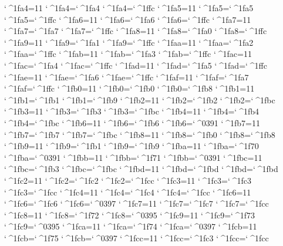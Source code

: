 \catcode`^^^^1fa4=11 \lccode`^^^^1fa4=`^^^^1fa4 \uccode`^^^^1fa4=`^^^^1ffc 
\catcode`^^^^1fa5=11 \lccode`^^^^1fa5=`^^^^1fa5 \uccode`^^^^1fa5=`^^^^1ffc 
\catcode`^^^^1fa6=11 \lccode`^^^^1fa6=`^^^^1fa6 \uccode`^^^^1fa6=`^^^^1ffc 
\catcode`^^^^1fa7=11 \lccode`^^^^1fa7=`^^^^1fa7 \uccode`^^^^1fa7=`^^^^1ffc 
\catcode`^^^^1fa8=11 \lccode`^^^^1fa8=`^^^^1fa0 \uccode`^^^^1fa8=`^^^^1ffc 
\catcode`^^^^1fa9=11 \lccode`^^^^1fa9=`^^^^1fa1 \uccode`^^^^1fa9=`^^^^1ffc 
\catcode`^^^^1faa=11 \lccode`^^^^1faa=`^^^^1fa2 \uccode`^^^^1faa=`^^^^1ffc 
\catcode`^^^^1fab=11 \lccode`^^^^1fab=`^^^^1fa3 \uccode`^^^^1fab=`^^^^1ffc 
\catcode`^^^^1fac=11 \lccode`^^^^1fac=`^^^^1fa4 \uccode`^^^^1fac=`^^^^1ffc 
\catcode`^^^^1fad=11 \lccode`^^^^1fad=`^^^^1fa5 \uccode`^^^^1fad=`^^^^1ffc 
\catcode`^^^^1fae=11 \lccode`^^^^1fae=`^^^^1fa6 \uccode`^^^^1fae=`^^^^1ffc 
\catcode`^^^^1faf=11 \lccode`^^^^1faf=`^^^^1fa7 \uccode`^^^^1faf=`^^^^1ffc 
\catcode`^^^^1fb0=11 \lccode`^^^^1fb0=`^^^^1fb0 \uccode`^^^^1fb0=`^^^^1fb8 
\catcode`^^^^1fb1=11 \lccode`^^^^1fb1=`^^^^1fb1 \uccode`^^^^1fb1=`^^^^1fb9 
\catcode`^^^^1fb2=11 \lccode`^^^^1fb2=`^^^^1fb2 \uccode`^^^^1fb2=`^^^^1fbc 
\catcode`^^^^1fb3=11 \lccode`^^^^1fb3=`^^^^1fb3 \uccode`^^^^1fb3=`^^^^1fbc 
\catcode`^^^^1fb4=11 \lccode`^^^^1fb4=`^^^^1fb4 \uccode`^^^^1fb4=`^^^^1fbc 
\catcode`^^^^1fb6=11 \lccode`^^^^1fb6=`^^^^1fb6 \uccode`^^^^1fb6=`^^^^0391 
\catcode`^^^^1fb7=11 \lccode`^^^^1fb7=`^^^^1fb7 \uccode`^^^^1fb7=`^^^^1fbc 
\catcode`^^^^1fb8=11 \lccode`^^^^1fb8=`^^^^1fb0 \uccode`^^^^1fb8=`^^^^1fb8 
\catcode`^^^^1fb9=11 \lccode`^^^^1fb9=`^^^^1fb1 \uccode`^^^^1fb9=`^^^^1fb9 
\catcode`^^^^1fba=11 \lccode`^^^^1fba=`^^^^1f70 \uccode`^^^^1fba=`^^^^0391 
\catcode`^^^^1fbb=11 \lccode`^^^^1fbb=`^^^^1f71 \uccode`^^^^1fbb=`^^^^0391 
\catcode`^^^^1fbc=11 \lccode`^^^^1fbc=`^^^^1fb3 \uccode`^^^^1fbc=`^^^^1fbc 
\catcode`^^^^1fbd=11 \lccode`^^^^1fbd=`^^^^1fbd \uccode`^^^^1fbd=`^^^^1fbd 
\catcode`^^^^1fc2=11 \lccode`^^^^1fc2=`^^^^1fc2 \uccode`^^^^1fc2=`^^^^1fcc 
\catcode`^^^^1fc3=11 \lccode`^^^^1fc3=`^^^^1fc3 \uccode`^^^^1fc3=`^^^^1fcc 
\catcode`^^^^1fc4=11 \lccode`^^^^1fc4=`^^^^1fc4 \uccode`^^^^1fc4=`^^^^1fcc 
\catcode`^^^^1fc6=11 \lccode`^^^^1fc6=`^^^^1fc6 \uccode`^^^^1fc6=`^^^^0397 
\catcode`^^^^1fc7=11 \lccode`^^^^1fc7=`^^^^1fc7 \uccode`^^^^1fc7=`^^^^1fcc 
\catcode`^^^^1fc8=11 \lccode`^^^^1fc8=`^^^^1f72 \uccode`^^^^1fc8=`^^^^0395 
\catcode`^^^^1fc9=11 \lccode`^^^^1fc9=`^^^^1f73 \uccode`^^^^1fc9=`^^^^0395 
\catcode`^^^^1fca=11 \lccode`^^^^1fca=`^^^^1f74 \uccode`^^^^1fca=`^^^^0397 
\catcode`^^^^1fcb=11 \lccode`^^^^1fcb=`^^^^1f75 \uccode`^^^^1fcb=`^^^^0397 
\catcode`^^^^1fcc=11 \lccode`^^^^1fcc=`^^^^1fc3 \uccode`^^^^1fcc=`^^^^1fcc 
